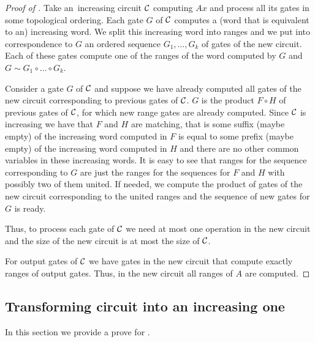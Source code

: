 \documentclass{toc}
\begin{document}
\begin{proof}[Proof of {}]
    Take an~increasing circuit ${\cal C}$ computing $Ax$ and process all its gates in some topological ordering. Each gate $G$ of ${\cal C}$ computes a (word that is equivalent to an) increasing word. We split this increasing word into ranges and we put into correspondence to $G$ an ordered sequence $G_1,\ldots, G_k$ of gates of the new circuit. Each of these gates compute one of the ranges of the word computed by $G$ and $G \sim G_1\circ\ldots \circ G_k$.

    Consider a gate $G$ of ${\cal C}$ and suppose we have already computed all gates of the new circuit corresponding to previous gates of ${\cal C}$. $G$ is the product $F \circ H$ of previous gates of ${\cal C}$, for which new range gates are already computed. Since ${\cal C}$ is increasing we have that $F$ and $H$ are matching, that is some suffix (maybe empty) of the increasing word computed in $F$ is equal to some prefix (maybe empty) of the increasing word computed in $H$ and there are no other common variables in these increasing words. It is easy to see that ranges for the sequence corresponding to $G$ are just the ranges for the sequences for $F$ and $H$ with possibly two of them united. If needed, we compute the product of gates of the new circuit corresponding to the united ranges and the sequence of new gates for $G$ is ready.

    Thus, to process each gate of ${\cal C}$ we need at most one operation in the new circuit and the size of the new circuit is at most the size of ${\cal C}$.

    For output gates of ${\cal C}$ we have gates in the new circuit that compute exactly ranges of output gates. Thus, in the new circuit all ranges of $A$ are computed.
\end{proof}

%

%
%

%

%

%

%
%


\subsection{Transforming circuit into an increasing one}
\label{sec:increasing_circuits}

%
In this section we provide a prove for .
%
\end{document}
